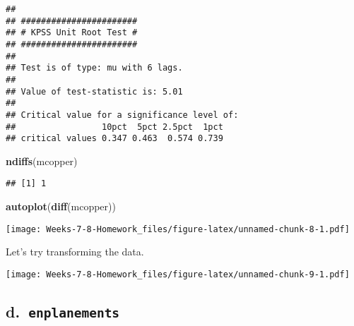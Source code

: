 \documentclass[]{article}
\newenvironment{Shaded}{\begin{snugshade}}{\end{snugshade}}
\newcommand{\KeywordTok}[1]{\textcolor[rgb]{0.13,0.29,0.53}{\textbf{#1}}}
\newcommand{\NormalTok}[1]{#1}
\newcommand{\OperatorTok}[1]{\textcolor[rgb]{0.81,0.36,0.00}{\textbf{#1}}}
\newcommand{\StringTok}[1]{\textcolor[rgb]{0.31,0.60,0.02}{#1}}
\begin{document}
\begin{Shaded}
\end{Shaded}

\begin{verbatim}
## 
## ####################### 
## # KPSS Unit Root Test # 
## ####################### 
## 
## Test is of type: mu with 6 lags. 
## 
## Value of test-statistic is: 5.01 
## 
## Critical value for a significance level of: 
##                 10pct  5pct 2.5pct  1pct
## critical values 0.347 0.463  0.574 0.739
\end{verbatim}

\begin{Shaded}
\begin{Highlighting}[]
\KeywordTok{ndiffs}\NormalTok{(mcopper)}
\end{Highlighting}
\end{Shaded}

\begin{verbatim}
## [1] 1
\end{verbatim}

\begin{Shaded}
\begin{Highlighting}[]
\KeywordTok{autoplot}\NormalTok{(}\KeywordTok{diff}\NormalTok{(mcopper))}
\end{Highlighting}
\end{Shaded}

\texttt{[image: Weeks-7-8-Homework\_files/figure-latex/unnamed-chunk-8-1.pdf]}

Let's try transforming the data.

\begin{Shaded}
\end{Shaded}

\texttt{[image: Weeks-7-8-Homework\_files/figure-latex/unnamed-chunk-9-1.pdf]}

\hypertarget{d.-enplanements}{%
\subsection{\texorpdfstring{d.~\texttt{enplanements}}{d.~enplanements}}\label{d.-enplanements}}
\end{document}

